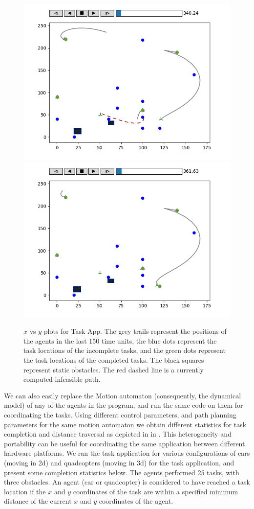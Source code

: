 \begin{figure}[h!]
\begin{minipage}{0.5\textwidth}
\includegraphics[width=.5\textwidth]{figs/task2.png}\hfill
\includegraphics[width=.5\textwidth]{figs/task1.png}\hfill%
\end{minipage}%
\caption{\small $x$ vs $y$ plots for Task App. The grey trails represent the positions of the agents in the last 150 time units, the blue dots represent the task locations of the incomplete tasks, and the green dots represent the task locations of the completed tasks. The black squares represent static obstacles. The red dashed line is a currently computed infeasible path.}
\label{fig:taskplots}
\end{figure}

We can also easily replace the Motion automaton (consequently, the dynamical model) of any of the agents in the program, and run the same code on them for coordinating the tasks. Using different control parameters, and path planning parameters for the same motion automaton we obtain different statistics for task completion and distance traversal as depicted in in . This heterogeneity and portability can be useful for coordinating the same application between different hardware platforms. We ran the task application for various configurations of cars (moving in 2d) and quadcopters (moving in 3d) for the task application, and present some completion statistics below. The agents performed 25 tasks, with three obstacles. An agent (car or quadcopter) is considered to have reached a task location if the $x$ and $y$ coordinates of the task are within a specified minimum distance of the current $x$ and $y$ coordinates of the agent.

